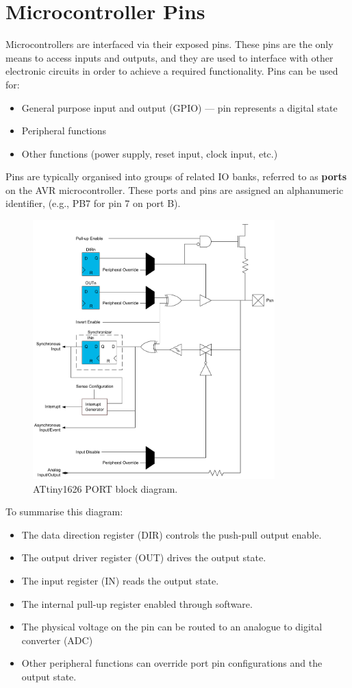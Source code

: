 \documentclass[a4paper]{report}
\begin{document}
\section{Microcontroller Pins}
Microcontrollers are interfaced via their exposed pins.
These pins are the only means to access inputs and outputs, and
they are used to interface with other electronic circuits in order to achieve a required functionality.
Pins can be used for:
\begin{itemize}
    \item General purpose input and output (GPIO) --- pin represents a digital state
    \item Peripheral functions
    \item Other functions (power supply, reset input, clock input, etc.)
\end{itemize}
Pins are typically organised into groups of related IO banks,
referred to as \textbf{ports} on the AVR microcontroller.
These ports and pins are assigned an alphanumeric identifier, (e.g., PB7 for pin 7 on port B).
\begin{figure}[H]
    \centering
    \includegraphics[height = 10cm, keepaspectratio = true]{figures/PORT_block_diagram.pdf}
    \caption{ATtiny1626 PORT block diagram.} %
\end{figure}
To summarise this diagram:
\begin{itemize}
    \item The data direction register (DIR) controls the push-pull output enable.
    \item The output driver register (OUT) drives the output state.
    \item The input register (IN) reads the output state.
    \item The internal pull-up register enabled through software.
    \item The physical voltage on the pin can be routed to an analogue to digital converter (ADC)
    \item Other peripheral functions can override port pin configurations and the output state.
\end{itemize}
\end{document}
